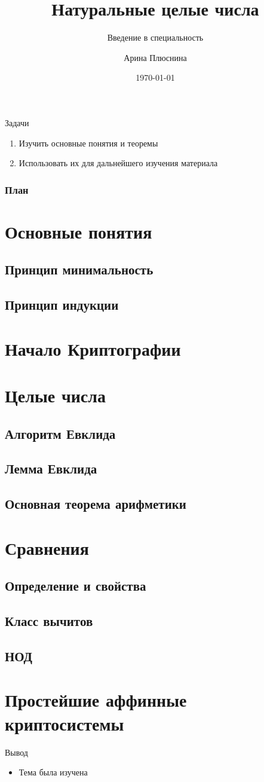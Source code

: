 \documentclass{beamer}
\title{Натуральные целые числа}
\subtitle{Введение в специальность}
\author{Арина Плюснина}
\institute{БФУ им. И. Канта}
\date{\today}
\begin{document}
\begin{frame}
	\titlepage
\end{frame}
\begin{frame}{Задачи}
	\begin{enumerate}
		\item Изучить основные понятия и теоремы
		\item Использовать их для дальнейшего изучения материала
	\end{enumerate}
\end{frame}
\begin{frame}
	\frametitle{План}
	\tableofcontents
	\section{Основные понятия}
	\subsection{Принцип минимальность}
	\subsection{Принцип индукции}
	\section{Начало Криптографии}
	\section{Целые числа}
	\subsection{Алгоритм Евклида}
	\subsection{Лемма Евклида}
	\subsection{Основная теорема арифметики}
	\section{Сравнения}
	\subsection{Определение и свойства}
	\subsection{Класс вычитов}
	\subsection{НОД}
	\section{Простейшие аффинные криптосистемы}
\end{frame}

\begin{frame}{Вывод}
	\begin{itemize}
	\item Тема была изучена
	\end{itemize}	
\end{frame}
\end{document}
